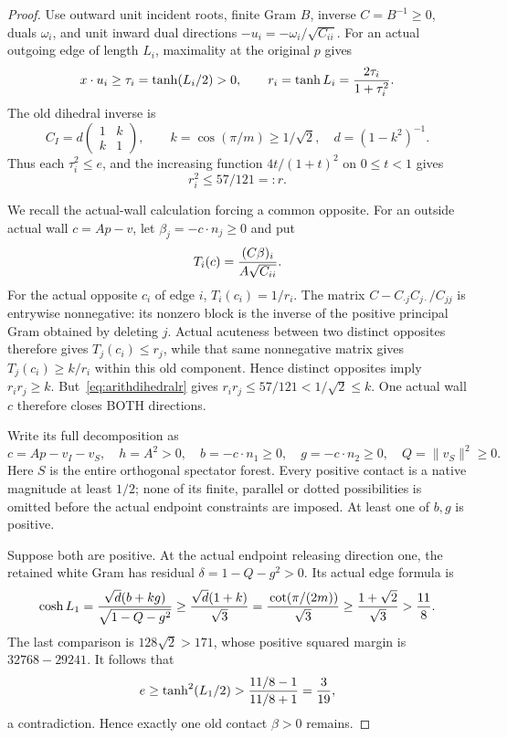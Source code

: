 \begin{proof}
Use outward unit incident roots, finite Gram \(B\), inverse
\(C=B^{-1}\ge0\), duals \(\omega_i\), and unit inward dual
directions \(-u_i=-\omega_i/\sqrt{C_{ii}}\).
For an actual outgoing edge of length \(L_i\), maximality at
the original \(p\) gives
\[
 x\cdot u_i\ge\tau_i=\tanh(L_i/2)>0,\qquad
 r_i=\tanh L_i={2\tau_i\over1+\tau_i^2}.
\]
The old dihedral inverse is
\[
 C_I=d\begin{pmatrix}1&k\\k&1\end{pmatrix},\qquad
 k=\cos(\pi/m)\ge1/\sqrt2,\quad d=(1-k^2)^{-1}.
\]
Thus each \(\tau_i^2\le e\), and the increasing function
\(4t/(1+t)^2\) on \(0\le t<1\) gives
\[
                         r_i^2\le57/121=:r .
\tag{Dih1}\label{eq:arithdihedralr}
\]

We recall the actual-wall calculation forcing a common opposite.
For an outside actual wall \(c=Ap-v\), let
\(\beta_j=-c\cdot n_j\ge0\) and put
\[
 T_i(c)={(C\beta)_i\over A\sqrt{C_{ii}}}.
\]
For the actual opposite \(c_i\) of edge \(i\),
\(T_i(c_i)=1/r_i\).
The matrix
\(C-C_{\cdot j}C_{j\cdot}/C_{jj}\)
is entrywise nonnegative: its nonzero block is the inverse of
the positive principal Gram obtained by deleting \(j\).
Actual acuteness between two distinct opposites therefore gives
\(T_j(c_i)\le r_j\), while that same nonnegative matrix gives
\(T_j(c_i)\ge k/r_i\) within this old component.
Hence distinct opposites imply \(r_ir_j\ge k\).
But~\eqref{eq:arithdihedralr} gives
\(r_ir_j\le57/121<1/\sqrt2\le k\).
One actual wall \(c\) therefore closes BOTH directions.

Write its full decomposition as
\[
 c=Ap-v_I-v_S,\quad h=A^2>0,\quad
 b=-c\cdot n_1\ge0,\quad g=-c\cdot n_2\ge0,\quad
 Q=\|v_S\|^2\ge0 .
\]
Here \(S\) is the entire orthogonal spectator forest.
Every positive contact is a native magnitude at least \(1/2\);
none of its finite, parallel or dotted possibilities is omitted
before the actual endpoint constraints are imposed.
At least one of \(b,g\) is positive.

Suppose both are positive.
At the actual endpoint releasing direction one, the retained
white Gram has residual \(\delta=1-Q-g^2>0\).
Its actual edge formula is
\[
 \cosh L_1={\sqrt d(b+kg)\over\sqrt{1-Q-g^2}}
 \ge{\sqrt d(1+k)\over\sqrt3}
 ={\,\cot(\pi/(2m))\over\sqrt3}
 \ge{1+\sqrt2\over\sqrt3}>{11\over8}.
\]
The last comparison is \(128\sqrt2>171\), whose positive
squared margin is \(32768-29241\).
It follows that
\[
 e\ge\tanh^2(L_1/2)>
 {11/8-1\over11/8+1}={3\over19},
\]
a contradiction.  Hence exactly one old contact \(\beta>0\)
remains.


\end{proof}
